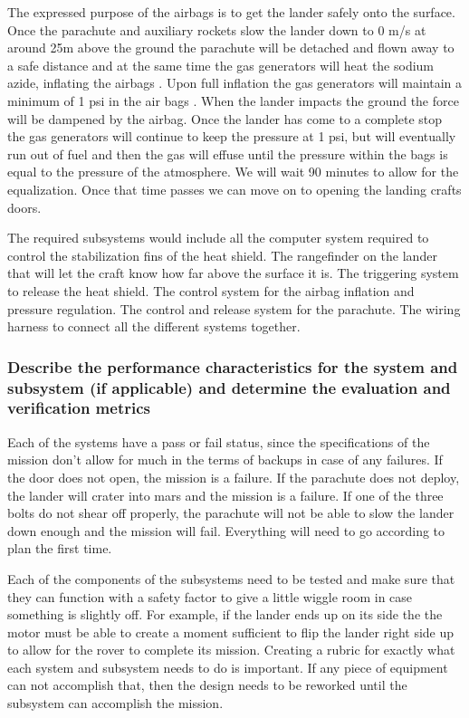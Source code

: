 \documentclass[%
 portrait,
 aapm,
 mph,%
 amsmath,amssymb,
 reprint,%
]{revtex4-2}
\begin{document}
The expressed purpose of the airbags is to get the lander safely onto the surface.  Once the parachute and auxiliary rockets slow the lander down to 0 m/s at around 25m above the ground the parachute will be detached and flown away to a safe distance and at the same time the gas generators will heat the sodium azide, inflating the airbags \cite{NASAMarsExplorationRovers:002}.  Upon full inflation the gas generators will maintain a minimum of 1 psi in the air bags \cite{JPL:000}.  When the lander impacts the ground the force will be dampened by the airbag.  Once the lander has come to a complete stop the gas generators will continue to keep the pressure at 1 psi, but will eventually run out of fuel and then the gas will effuse until the pressure within the bags is equal to the pressure of the atmosphere.  We will wait 90 minutes to allow for the equalization.  Once that time passes we can move on to opening the landing crafts doors.

The required subsystems would include all the computer system required to control the stabilization fins of the heat shield.  The rangefinder on the lander that will let the craft know how far above the surface it is.  The triggering system to release the heat shield.  The control system for the airbag  inflation and pressure regulation.  The control and release system for the parachute.  The wiring harness to connect all the different systems together.

\subsubsection{Describe the performance characteristics for the system and subsystem (if applicable) and determine the evaluation and verification metrics}
Each of the systems have a pass or fail status, since the specifications of the mission don’t allow for much in the terms of backups in case of any failures.  If the door does not open, the mission is a failure.  If the parachute does not deploy, the lander will crater into mars and the mission is a failure.  If one of the three bolts do not shear off properly, the parachute will not be able to slow the lander down enough and the mission will fail.  Everything will need to go according to plan the first time.

Each of the components of the subsystems need to be tested and make sure that they can function with a safety factor to give a little wiggle room in case something is slightly off.  For example, if the lander ends up on its side the the motor must be able to create a moment sufficient to flip the lander right side up to allow for the rover to complete its mission.  Creating a rubric for exactly what each system and subsystem needs to do is important.  If any piece of equipment can not accomplish that, then the design needs to be reworked until the subsystem can accomplish the mission.
\end{document}
